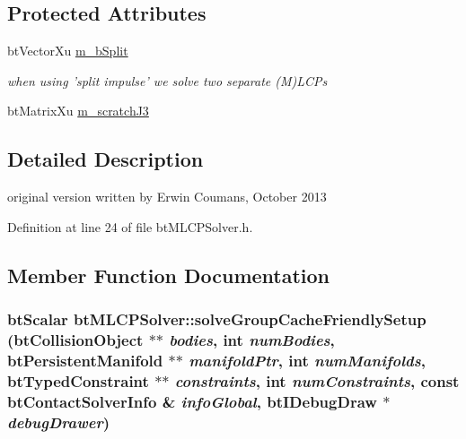 \subsection*{Protected Attributes}
\begin{CompactItemize}
\item 
\hypertarget{classbt_m_l_c_p_solver_9c1feb6855fa296c8ca582842f8e4fe3}{
btVectorXu \hyperlink{classbt_m_l_c_p_solver_9c1feb6855fa296c8ca582842f8e4fe3}{m\_\-bSplit}}
\label{classbt_m_l_c_p_solver_9c1feb6855fa296c8ca582842f8e4fe3}

\begin{CompactList}\small\item\em when using 'split impulse' we solve two separate (M)LCPs \item\end{CompactList}\item 
btMatrixXu \hyperlink{classbt_m_l_c_p_solver_8430698267e9572498e04e8dba3cda3b}{m\_\-scratchJ3}
\end{CompactItemize}


\subsection{Detailed Description}
original version written by Erwin Coumans, October 2013 

Definition at line 24 of file btMLCPSolver.h.

\subsection{Member Function Documentation}
\hypertarget{classbt_m_l_c_p_solver_a465e167537eceb89f7125d3bb2d5321}{
\subsubsection[solveGroupCacheFriendlySetup]{\setlength{\rightskip}{0pt plus 5cm}btScalar btMLCPSolver::solveGroupCacheFriendlySetup (btCollisionObject $\ast$$\ast$ {\em bodies}, \/  int {\em numBodies}, \/  btPersistentManifold $\ast$$\ast$ {\em manifoldPtr}, \/  int {\em numManifolds}, \/  btTypedConstraint $\ast$$\ast$ {\em constraints}, \/  int {\em numConstraints}, \/  const btContactSolverInfo \& {\em infoGlobal}, \/  {\bf btIDebugDraw} $\ast$ {\em debugDrawer})}}
\label{classbt_m_l_c_p_solver_a465e167537eceb89f7125d3bb2d5321}




